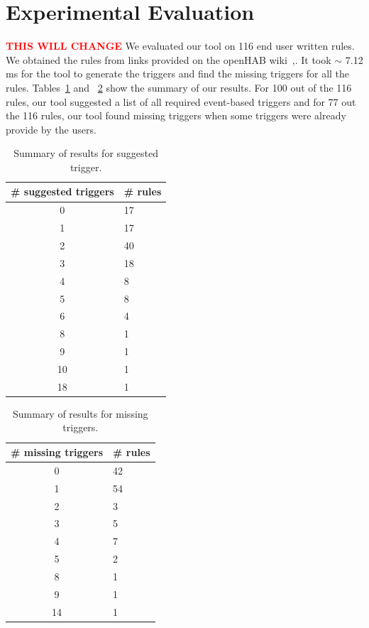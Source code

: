 \documentclass{sig-alternate-05-2015}
\newcommand\todo[1]{\textbf{\textcolor{red}{#1}}}
\begin{document}
\section{Experimental Evaluation}
\todo{THIS WILL CHANGE}
We evaluated our tool on 116 end user written rules. We obtained the rules from links provided on the openHAB wiki~\cite{data1},\cite{data2}. It took $\sim$ 7.12 ms for the tool to generate the triggers and find the missing triggers for all the rules. Tables~\ref{tab:results1} and ~\ref{tab:results2} show the summary of our results. For 100 out of the 116 rules, our tool suggested a list of all required event-based triggers and for 77 out the 116 rules, our tool found missing triggers when some triggers were already provide by the users.  
\begin{table}[ht]
\centering
\begin{tabular}{|c|p{1.1cm}|}
\hline
\# suggested triggers & \# rules \\ \hline
0 & 17\\ \hline
1 & 17\\ \hline
2 & 40\\ \hline
3 & 18\\ \hline
4 & 8\\ \hline
5 & 8\\ \hline
6 & 4\\ \hline
8 & 1\\ \hline
9 & 1\\ \hline
10 & 1\\ \hline
18 & 1\\ \hline
\end{tabular}
\caption{Summary of results for suggested trigger.}
\label{tab:results1}
\end{table}

\begin{table}[ht]
\centering
\begin{tabular}{|c|p{1.1cm}|}
\hline
\# missing triggers & \# rules \\ \hline
0 & 42 \\\hline
1 & 54 \\\hline
2 & 3 \\\hline
3 & 5\\\hline
4 & 7\\\hline
5 & 2\\\hline
8 & 1 \\\hline
9 & 1 \\\hline
14 & 1 \\\hline
\end{tabular}
\caption{Summary of results for missing triggers.}
\label{tab:results2}
\end{table}
\end{document}
